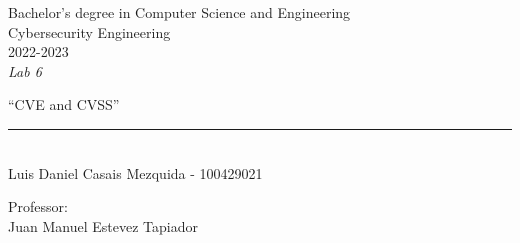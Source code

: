 \begin{titlepage}
    \begin{sffamily}
    \color{azulUC3M}
    \begin{center}
        \begin{figure}[H]
        \end{figure}
        \vspace{1.5cm}
        \begin{Large}
            Bachelor's degree in Computer Science and Engineering\\
            Cybersecurity Engineering\\
            2022-2023\\
            \vspace{2cm}
            \textsl{Lab 6}
            \bigskip

        \end{Large}
            {\Huge ``CVE and CVSS''}\\
            \vspace*{0.5cm}
            \rule{10.5cm}{0.1mm}\\
            \vspace*{0.9cm}
            {\LARGE Luis Daniel Casais Mezquida - 100429021}\\
            \vspace*{0.2cm}

            \vspace*{0.8cm}
        \begin{Large}
            Professor:\\
            Juan Manuel Estevez Tapiador\\
        \end{Large}
    \end{center}
    \vfill

    \end{sffamily}
\end{titlepage}